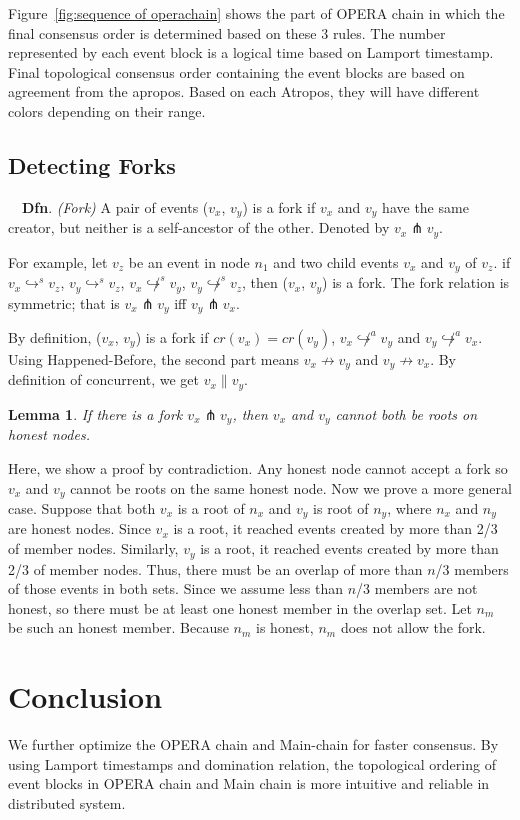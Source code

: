 \documentclass{article}
\newtheorem{lem}[thm]{Lemma}
\newcommand{\dfnn}[2]{$\quad$\textbf{Dfn}. \emph{(#1)} {#2}}
\newcommand{\eself}{\hookrightarrow^{s}}
\newcommand{\eancestor}{\hookrightarrow^{a}}
\newcommand{\efork}{\pitchfork}
\newcommand{\concur}{\parallel}
\begin{document}
Figure~\ref{fig:sequence of operachain} shows the part of OPERA chain in which the final consensus order is determined based on these 3 rules. The number represented by each event block is a logical time based on Lamport timestamp. Final topological consensus order containing the event blocks are based on agreement from the apropos. Based on each Atropos, they will have different colors depending on their range.


\subsection{Detecting Forks}

\dfnn{Fork}{A pair of events ($v_x$, $v_y$) is a fork if $v_x$ and $v_y$ have the same creator, but neither is a self-ancestor of the other. Denoted by $v_x \efork v_y$.}

For example, let $v_z$ be an event in node $n_1$ and two child events $v_x$ and $v_y$ of $v_z$. if $v_x \eself v_z$, $v_y \eself v_z$, $v_x \not \eself v_y$, $v_y \not \eself v_z$, then ($v_x$, $v_y$) is a fork.
The fork relation is symmetric; that is $v_x \efork v_y$ iff $v_y \efork v_x$.

By definition, ($v_x$, $v_y$) is a fork if $cr(v_x)=cr(v_y)$, $v_x \not \eancestor v_y$ and $v_y \not \eancestor v_x$. Using Happened-Before, the second part means $v_x \not \rightarrow v_y$ and $v_y \not \rightarrow v_x$. By definition of concurrent, we get $v_x \concur v_y$.

\begin{lem}
If there is a fork $v_x \efork  v_y$, then $v_x$ and $v_y$ cannot both be roots on honest nodes.
\end{lem}
Here, we show a proof by contradiction. Any honest node cannot accept a fork so $v_x$ and $v_y$ cannot be roots on the same honest node. Now we prove a more general case. Suppose that both $v_x$ is a root of $n_x$ and $v_y$ is root of $n_y$, where $n_x$ and $n_y$ are honest nodes. Since $v_x$ is a root, it reached events created by more than 2/3 of member nodes. Similarly, $v_y$ is a root, it reached events created by more than 2/3 of member nodes. Thus, there must be an overlap of more than $n$/3 members of those events in both sets. Since we assume less than $n$/3 members are not honest, so there must be at least one honest member in the overlap set. Let $n_m$ be such an honest member. Because $n_m$ is honest, $n_m$ does not allow the fork.

\section{Conclusion}\label{se:con}
We further optimize the OPERA chain and Main-chain for faster consensus. By using Lamport timestamps and domination relation, the topological ordering of event blocks in OPERA chain and Main chain is more intuitive and reliable in distributed system. 
\end{document}
